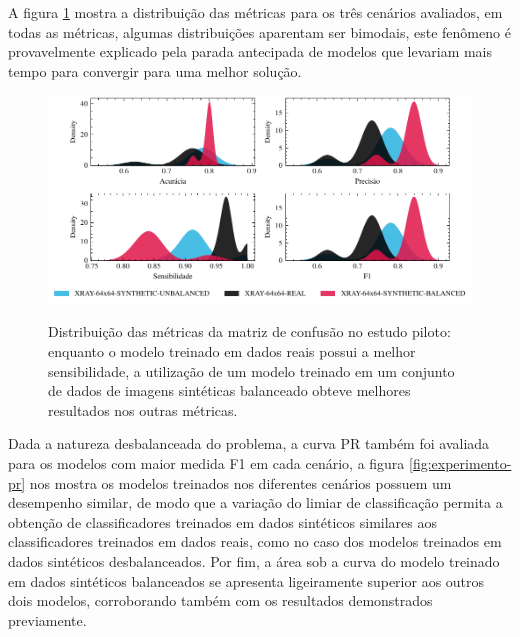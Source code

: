 A figura \ref{fig:experimento-metricas} mostra a distribuição das métricas para os três cenários avaliados, em todas as métricas, algumas distribuições aparentam ser bimodais, este fenômeno é provavelmente explicado pela parada antecipada de modelos que levariam mais tempo para convergir para uma melhor solução.

\begin{figure}[htbp]
	\centering
	\caption[Distribuição das métricas da matriz de confusão no estudo piloto]{Distribuição das métricas da matriz de confusão no estudo piloto: enquanto o modelo treinado em dados reais possui a melhor sensibilidade, a utilização de um modelo treinado em um conjunto de dados de imagens sintéticas balanceado obteve melhores resultados nos outras métricas.}
		\includegraphics[scale=.9]{imagens/experimento-metricas-densidade.pdf}
	\label{fig:experimento-metricas}
\end{figure}

Dada a natureza desbalanceada do problema, a curva PR também foi avaliada para os modelos com maior medida F1 em cada cenário, a figura \ref{fig:experimento-pr} nos mostra os modelos treinados nos diferentes cenários possuem um desempenho similar, de modo que a variação do limiar de classificação permita a obtenção de classificadores treinados em dados sintéticos similares aos classificadores treinados em dados reais, como no caso dos modelos treinados em dados sintéticos desbalanceados. Por fim, a área sob a curva do modelo treinado em dados sintéticos balanceados se apresenta ligeiramente superior aos outros dois modelos, corroborando também com os resultados demonstrados previamente.

